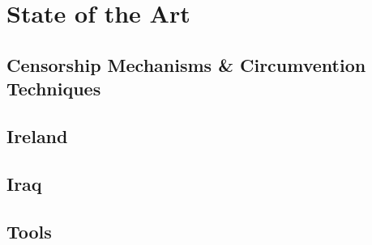 \chapter{State of the Art}
\section{Censorship Mechanisms \& Circumvention Techniques}

\section{Ireland}

\section{Iraq}

\section{Tools}
